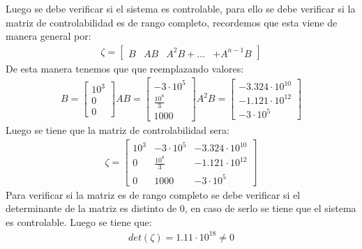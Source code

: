 \documentclass[
  11pt,
  letterpaper,
   addpoints,
   answers
  ]{exam}
\begin{document}
\begin{questions}
\begin{solution}
        Luego se debe verificar si el sistema es controlable, para ello se debe verificar si la matriz de controlabilidad es de rango completo, recordemos que esta viene de manera general por:
        \begin{align}
            \zeta =
            \begin{bmatrix}
                 B & AB & A^{2}B + \dots & + A^{n-1}B
            \end{bmatrix}
        \end{align}
        De esta manera tenemos que que reemplazando valores:
        \begin{align}
            B = 
            \begin{bmatrix}
                10^{3}\\
                0\\
                0
            \end{bmatrix}
            AB = 
            \begin{bmatrix}
                -3 \cdot 10^{5}\\
                \frac{10^{8}}{3}\\
                1000
            \end{bmatrix}
            A^{2}B = 
            \begin{bmatrix}
                -3.324 \cdot 10^{10}\\
                -1.121 \cdot 10^{12}\\
                -3\cdot 10^{5}
            \end{bmatrix}
        \end{align}
        Luego se tiene que la matriz de controlabilidad sera:
        \begin{align}
            \zeta =
            \begin{bmatrix}
                10^{3} & -3 \cdot 10^{5} & -3.324 \cdot 10^{10}\\
                0 & \frac{10^{8}}{3} & -1.121 \cdot 10^{12}\\
                0 & 1000 & -3\cdot 10^{5}
            \end{bmatrix}
        \end{align}
        Para verificar si la matriz es de rango completo se debe verificar si el determinante de la matriz es distinto de 0, en caso de serlo se tiene que el sistema es controlable. Luego se tiene que:
        \begin{align}
            det(\zeta) = 1.11 \cdot 10^{18} \neq 0
        \end{align}

\end{solution}
\end{questions}
\end{document}
